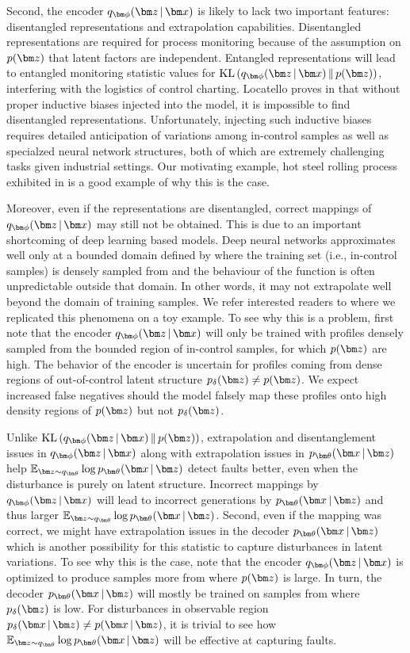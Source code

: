 \documentclass[journal, peerreview]{IEEEtran}
\begin{document}
Second, the encoder $\encoding$ is likely to lack two important features: disentangled representations and extrapolation capabilities. 
Disentangled representations are required for process monitoring because of the assumption on $\pz$ that latent factors are independent.
Entangled representations will lead to entangled monitoring statistic values for $\KL{\encoding}{p(\mbz)}$, interfering with the logistics of control charting.
Locatello \etal proves in \cite[Thm. 1]{locatello2018challenging} that without proper inductive biases injected into the model, it is impossible to find disentangled representations.
Unfortunately, injecting such inductive biases requires detailed anticipation of variations among in-control samples as well as specialzed neural network structures, both of which are extremely challenging tasks given industrial settings.
Our motivating example, hot steel rolling process exhibited in  is a good example of why this is the case.

Moreover, even if the representations are disentangled, correct mappings of $\encoding$ may still not be obtained.
This is due to an important shortcoming of deep learning based models. 
Deep neural networks approximates well only at a bounded domain defined by where the training set (i.e., in-control samples) is densely sampled from and the behaviour of the function is often unpredictable outside that domain. 
In other words, it may not extrapolate well beyond the domain of training samples.
We refer interested readers to  where we replicated this phenomena on a toy example.
To see why this is a problem, first note that the encoder $\encoding$ will only be trained with profiles densely sampled from the bounded region of in-control samples, for which $\pz$ are high.
The behavior of the encoder is uncertain for profiles coming from dense regions of out-of-control latent structure $p_{\delta}(\mbz)\neq\pz$.
We expect increased false negatives should the model falsely map these profiles onto high density regions of $\pz$ but not $p_{\delta}(\mbz)$.

Unlike $\KL{\encoding}{p(\mbz)}$, extrapolation and disentanglement issues in $\encoding$ along with extrapolation issues in $\decoding$ help $\E_{\mbz \sim q_{\mbtheta}} \log \decoding$ detect faults better, even when the disturbance is purely on latent structure.
Incorrect mappings by $\encoding$ will lead to incorrect generations by $\decoding$ and thus larger $\E_{\mbz \sim q_{\mbtheta}} \log \decoding$.
Second, even if the mapping was correct, we might have extrapolation issues in the decoder $\decoding$ which is another possibility for this statistic to capture disturbances in latent variations.
To see why this is the case, note that the encoder $\encoding$ is optimized to produce samples more from where $\pz$ is large. 
In turn, the decoder $\decoding$ will mostly be trained on samples from where $p_{\delta}(\mbz)$ is low. 
For disturbances in observable region $p_{\delta}(\mbx\g\mbz) \neq p(\mbx\g\mbz)$, it is trivial to see how $\E_{\mbz \sim q_{\mbtheta}} \log \decoding$ will be effective at capturing faults.
\end{document}
